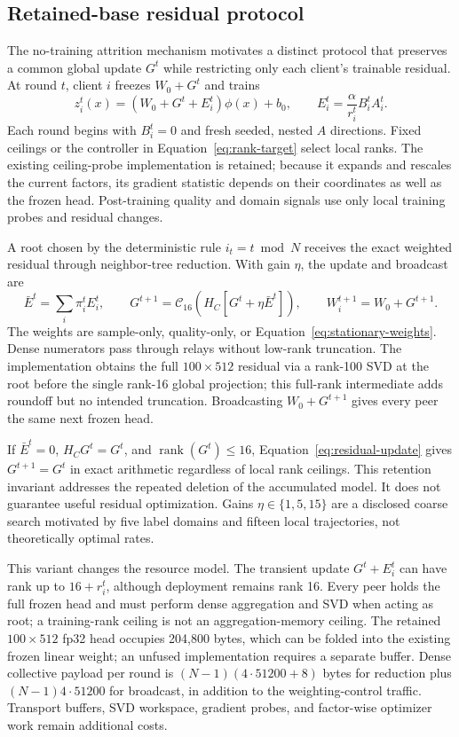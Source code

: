 \documentclass[11pt]{article}
\newcommand{\rank}{\operatorname{rank}}
\begin{document}
\subsection{Retained-base residual protocol}
The no-training attrition mechanism motivates a distinct protocol that preserves a common global update $G^t$ while restricting only each client's trainable residual. At round $t$, client $i$ freezes $W_0+G^t$ and trains
\begin{equation}
 z_i^t(x)=\left(W_0+G^t+E_i^t\right)\phi(x)+b_0,\qquad
 E_i^t=\frac{\alpha}{r_i^t}B_i^tA_i^t.
 \label{eq:residual-model}
\end{equation}
Each round begins with $B_i^t=0$ and fresh seeded, nested $A$ directions. Fixed ceilings or the controller in Equation~\eqref{eq:rank-target} select local ranks. The existing ceiling-probe implementation is retained; because it expands and rescales the current factors, its gradient statistic depends on their coordinates as well as the frozen head. Post-training quality and domain signals use only local training probes and residual changes.

A root chosen by the deterministic rule $i_t=t\bmod N$ receives the exact weighted residual through neighbor-tree reduction. With gain $\eta$, the update and broadcast are
\begin{equation}
 \bar E^t=\sum_i\pi_i^t E_i^t,\qquad
 G^{t+1}=\mathcal C_{16}\!\left(H_C[G^t+\eta\bar E^t]\right),\qquad
 W_i^{t+1}=W_0+G^{t+1}.
 \label{eq:residual-update}
\end{equation}
The weights are sample-only, quality-only, or Equation~\eqref{eq:stationary-weights}. Dense numerators pass through relays without low-rank truncation. The implementation obtains the full $100\times512$ residual via a rank-100 SVD at the root before the single rank-16 global projection; this full-rank intermediate adds roundoff but no intended truncation. Broadcasting $W_0+G^{t+1}$ gives every peer the same next frozen head.

If $\bar E^t=0$, $H_CG^t=G^t$, and $\rank(G^t)\le16$, Equation~\eqref{eq:residual-update} gives $G^{t+1}=G^t$ in exact arithmetic regardless of local rank ceilings. This retention invariant addresses the repeated deletion of the accumulated model. It does not guarantee useful residual optimization. Gains $\eta\in\{1,5,15\}$ are a disclosed coarse search motivated by five label domains and fifteen local trajectories, not theoretically optimal rates.

This variant changes the resource model. The transient update $G^t+E_i^t$ can have rank up to $16+r_i^t$, although deployment remains rank 16. Every peer holds the full frozen head and must perform dense aggregation and SVD when acting as root; a training-rank ceiling is not an aggregation-memory ceiling. The retained $100\times512$ fp32 head occupies 204,800 bytes, which can be folded into the existing frozen linear weight; an unfused implementation requires a separate buffer. Dense collective payload per round is $(N-1)(4\cdot51200+8)$ bytes for reduction plus $(N-1)4\cdot51200$ for broadcast, in addition to the weighting-control traffic. Transport buffers, SVD workspace, gradient probes, and factor-wise optimizer work remain additional costs.
\end{document}
